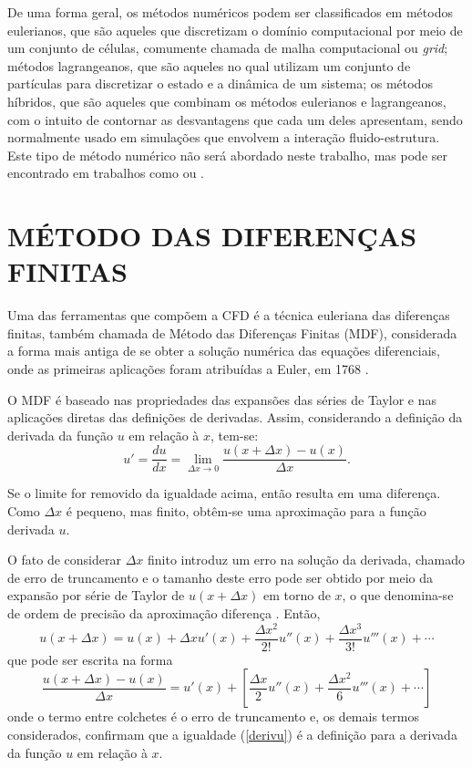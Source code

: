 De uma forma geral, os métodos numéricos podem ser classificados em métodos eulerianos, que são aqueles que discretizam o domínio computacional por meio de um conjunto de células, comumente chamada de malha computacional ou \textit{grid}; métodos lagrangeanos, que são aqueles no qual utilizam um conjunto de partículas para discretizar o estado e a dinâmica de um sistema; os métodos híbridos, que são aqueles que combinam os métodos eulerianos e lagrangeanos, com o intuito de contornar as desvantagens que cada um deles apresentam, sendo normalmente usado em simulações que envolvem a interação fluido-estrutura. Este tipo de método numérico não será abordado neste trabalho, mas pode ser encontrado em trabalhos como  ou . 

\section{MÉTODO DAS DIFERENÇAS FINITAS} \label{Dif_Fin}

Uma das ferramentas que compõem a CFD é a técnica euleriana das diferenças finitas, também chamada de Método das Diferenças Finitas (MDF), considerada a forma mais antiga de se obter a solução numérica das equações diferenciais, onde as primeiras aplicações foram atribuídas a Euler, em 1768 \cite{Hirsch}.

O MDF é baseado nas propriedades das expansões das séries de Taylor e nas aplicações diretas das definições de derivadas. Assim, considerando a definição da derivada da função $u$ em relação à $x$, tem-se:
\begin{equation} \label{derivu}
u' = \frac{ du}{ dx} = \lim_{ \Delta x \rightarrow 0} \frac{ u(x + \Delta x) - u(x)}{ \Delta x}.
\end{equation}

Se o limite for removido da igualdade acima, então resulta em uma diferença. Como $ \Delta x$ é pequeno, mas finito, obtêm-se uma aproximação para a função derivada $u$.

O fato de considerar $ \Delta x$ finito introduz um erro na solução da derivada, chamado de erro de truncamento e o tamanho deste erro pode ser obtido por meio da expansão por série de Taylor de $ u(x+ \Delta x)$ em torno de $x$, o que denomina-se de ordem de precisão da aproximação diferença \cite{Hirsch}. Então,  
\begin{equation} \label{Taylor}
u( x + \Delta x) = u(x) + \Delta x u'(x) + \frac{ \Delta x^2}{ 2!} u''(x) + \frac{ \Delta x^3}{ 3!} u'''(x) + \cdots 
\end{equation}
que pode ser escrita na forma
\begin{equation} \label{Taylortru}
\frac{ u( x + \Delta x) - u(x)}{ \Delta x} = u'(x) + \left[ \frac{ \Delta x}{2} u'' (x) + \frac{ \Delta x^{2}}{6} u''' (x) + \cdots \right]
\end{equation}
onde o termo entre colchetes é o erro de truncamento e, os demais termos considerados, confirmam que a igualdade (\ref{derivu}) é a definição para a derivada da função $u$ em relação à $x$.


